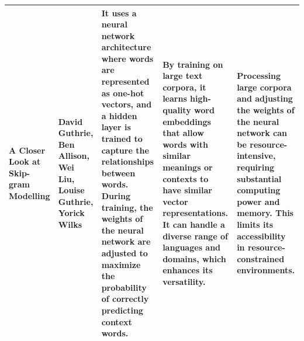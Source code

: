 \documentclass[conference]{IEEEtran}
\begin{document}
\begin{table}
\begin{center}
\begin{tabular}{ |p{2cm}|p{2cm}|p{4cm}|p{3cm}|p{4cm}| }
\hline
[13] A Closer Look at Skip-gram Modelling & David Guthrie, Ben Allison, Wei Liu, Louise Guthrie, Yorick Wilks &  It uses a neural network architecture where words are represented as one-hot vectors, and a hidden layer is trained to capture the relationships between words. During training, the weights of the neural network are adjusted to maximize the probability of correctly predicting context words. &  By training on large text corpora, it learns high-quality word embeddings that allow words with similar meanings or contexts to have similar vector representations. It can handle a diverse range of languages and domains, which enhances its versatility. &  Processing large corpora and adjusting the weights of the neural network can be resource-intensive, requiring substantial computing power and memory. This limits its accessibility in resource-constrained environments.  \\
\hline
\end{tabular}
\end{center}
\end{table}
\end{document}
